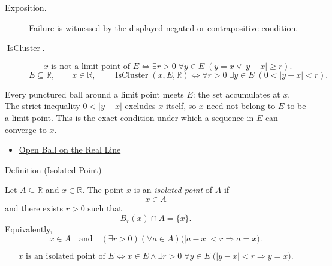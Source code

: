\begin{remark*}
\begin{description}
  \item[Exposition.]
  Failure is witnessed by the displayed negated or contrapositive condition.

  \item[\(\operatorname{IsCluster}.\)]
  \[
x \text{ is not a limit point of } E \Longleftrightarrow \exists r>0\;\forall y\in E\;(y=x \lor |y-x|\geq r).
\]
\[
E\subseteq\mathbb{R},\qquad x\in\mathbb{R},\qquad
\operatorname{IsCluster}(x,E,\mathbb{R})
\Longleftrightarrow
\forall r>0\;\exists y\in E\;(0<|y-x|<r).
\]
\end{description}
\end{remark*}
\begin{remark*}[Interpretation]
Every punctured ball around a limit point meets $E$: the set accumulates at $x$. The strict inequality $0<|y-x|$ excludes $x$ itself, so $x$ need not belong to $E$ to be a limit point. This is the exact condition under which a sequence in $E$ can converge to $x$.
\end{remark*}
\begin{dependencies}
\begin{itemize}
  \item \hyperref[def:open-ball]{Open Ball on the Real Line}
\end{itemize}
\end{dependencies}
\begin{definitionbox}{Definition (Isolated Point)}
\begin{definition}
\label{def:isolated-point}
Let $A\subseteq\mathbb{R}$ and $x\in\mathbb{R}$.  The point $x$ is an
\emph{isolated point} of $A$ if
\[
  x\in A
\]
and there exists $r>0$ such that
\[
  B_r(x)\cap A=\{x\}.
\]
Equivalently,
\[
  x\in A
  \quad\text{and}\quad
  (\exists r>0)(\forall a\in A)
  \bigl(|a-x|<r\Longrightarrow a=x\bigr).
\]
\end{definition}
\end{definitionbox}
\begin{remark*}
\[
x \text{ is an isolated point of } E
\Longleftrightarrow
x\in E \land \exists r>0\;\forall y\in E\;\bigl(|y-x|<r \Longrightarrow y=x\bigr).
\]
\end{remark*}

